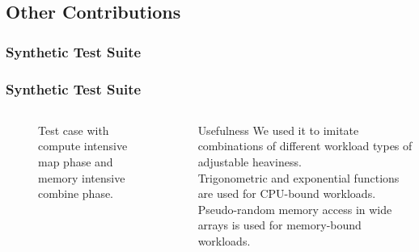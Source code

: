 %				
%				     
%	

\subsection{Other Contributions}
\subsubsection*{Synthetic Test Suite}
\begin{frame}
	\frametitle{Synthetic Test Suite}
	\begin{columns}[t]
	\vspace{-20pt}
	\begin{figure}[h]
		\caption*{Test case with compute intensive map phase and memory intensive combine phase.}
	\end{figure}
	
	\vspace{-20pt}
	\begin{block}{Usefulness}
	We used it to imitate combinations of different workload types of adjustable heaviness.\\[5pt]
	Trigonometric and exponential functions are used for CPU-bound workloads. Pseudo-random memory access in wide arrays is used for memory-bound workloads.
	\end{block}
	\end{columns}

\end{frame}

